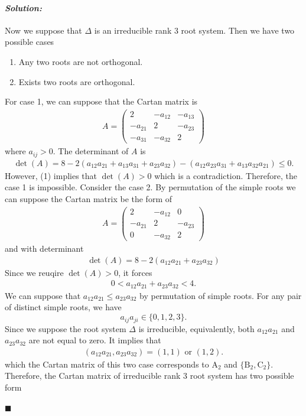 \documentclass[12pt, a4paper]{article}
\newenvironment{solution}
  {\paragraph{\textit{Solution:}}\par\medskip}
  {\hfill$\blacksquare$\vspace{0.1cm}}
\begin{document}
\begin{solution}
Now we suppose that $\Delta$ is an irreducible rank 3 root system. Then we have two possible cases 
\begin{enumerate}
  \item Any two roots are not orthogonal.
  \item Exists two roots are orthogonal.
\end{enumerate} 
For case 1, we can suppose that the Cartan matrix is 
\begin{align*}
  A=
\begin{pmatrix}
2&-a_{12}&-a_{13}\\
-a_{21}&2&-a_{23}\\
-a_{31}&-a_{32}&2
\end{pmatrix}
\end{align*}
where $a_{ij}>0$. The determinant of $A$ is 
\begin{align*}
  \det(A) = 8
-2(a_{12}a_{21}+a_{13}a_{31}+a_{23}a_{32})
-(a_{12}a_{23}a_{31}+a_{13}a_{32}a_{21})\le 0.
\end{align*}
However, (1) implies that $\det(A)>0$ which is a contradiction. Therefore, the case 1 is impossible.
Consider the case 2. By permutation of the simple roots we can suppose the Cartan matrix be the form of 
\begin{align*}
  A=
\begin{pmatrix}
2&-a_{12}&0\\
-a_{21}&2&-a_{23}\\
0&-a_{32}&2
\end{pmatrix}
\end{align*}
and with determinant 
\begin{align*}
  \det(A) = 8
-2(a_{12}a_{21}+a_{23}a_{32})
\end{align*}
Since we reuqire $\det(A)>0$, it forces 
\begin{align*}
  0<a_{12}a_{21}+a_{23}a_{32}<4.
\end{align*}
We can suppose that $a_{12}a_{21}\le a_{23}a_{32}$ by permutation of simple roots. For any pair of distinct simple roots, we have
\[
a_{ij}a_{ji}\in\{0,1,2,3\}.
\]
Since we suppose the root system $\Delta$ is irreducible, equivalently, both $a_{12}a_{21}$ and $a_{23}a_{32}$ are not equal to zero.
It implies that 
\begin{align*}
  (a_{12}a_{21},a_{23}a_{32}) = (1,1)\text{ or }(1,2).
\end{align*}
which the Cartan matrix of this two case corresponds to $\mathrm{A}_2$ and $\{\mathrm{B}_2,\mathrm{C}_2\}$. Therefore, the Cartan matrix of irreducible rank 3 root system has two possible form 

\end{solution}
\end{document}

